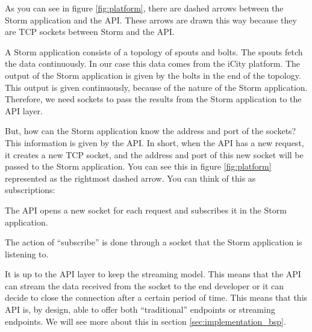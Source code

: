 As you can see in figure \ref{fig:platform}, there are dashed arrows between the
Storm application and the API. These arrows are drawn this way because they are
TCP sockets between Storm and the API.

A Storm application consists of a topology of spouts and bolts. The spouts
fetch the data continuously. In our case this data comes from the iCity
platform. The output of the Storm application is given by the bolts in the end
of the topology. This output is given continuously, because of the nature of the
Storm application. Therefore, we need sockets to pass the results from the
Storm application to the API layer.

But, how can the Storm application know the address and port of the sockets?
This information is given by the API. In short, when the API has a new request,
it creates a new TCP socket, and the address and port of this new socket will
be passed to the Storm application. You can see this in figure
\ref{fig:platform} represented as the rightmost dashed arrow. You can think of
this as subscriptions:

\mylist
  \item The API opens a new socket for each request and subscribes it in the
Storm application.
  \item The action of ``subscribe'' is done through a socket that the Storm
application is listening to.
  \item It is up to the API layer to keep the streaming model. This means that
the API can stream the data received from the socket to the end developer or it
can decide to close the connection after a certain period of time. This means
that this API is, by design, able to offer both ``traditional'' endpoints or
streaming endpoints. We will see more about this in section
\ref{sec:implementation_bsp}.
\mylistend
